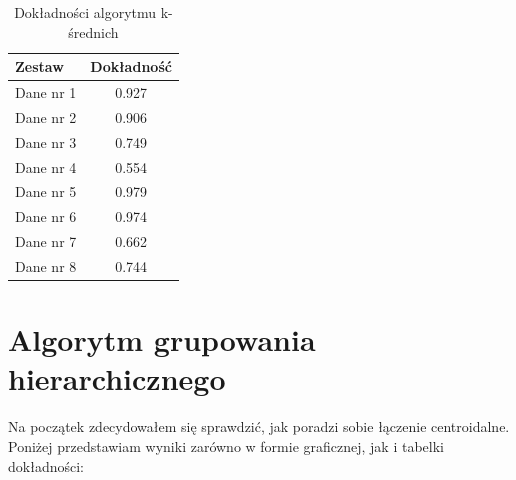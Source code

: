 \documentclass[polish,12pt,a4paper]{extarticle}
\begin{document}
\begin{table}[h!]
\centering
\begin{tabular}{|l|c|}
\hline
\textbf{Zestaw} & \textbf{Dokładność} \\
\hline
Dane nr 1 & 0.927 \\
Dane nr 2 & 0.906 \\
Dane nr 3 & 0.749 \\
Dane nr 4 & 0.554 \\
Dane nr 5 & 0.979 \\
Dane nr 6 & 0.974 \\
Dane nr 7 & 0.662 \\
Dane nr 8 & 0.744 \\
\hline
\end{tabular}
\caption{Dokładności algorytmu k-średnich}
\label{tab:metrics}
\end{table}

\section*{Algorytm grupowania hierarchicznego}
Na początek zdecydowałem się sprawdzić, jak poradzi sobie łączenie centroidalne. Poniżej przedstawiam wyniki zarówno w formie graficznej, jak i tabelki dokładności:
\end{document}
